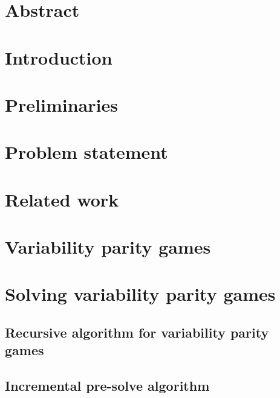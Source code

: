 \documentclass[a4paper,10pt]{report}
\author{Sjef van Loo}
\begin{document}
	
	
	
	\normalsize
	
	\chapter*{Abstract}\label{chapter:Abstract}
	\setcounter{page}{0}
	
	
	\tableofcontents
	
	\chapter{Introduction}\label{chapter:Introduction}
	\setcounter{page}{0}
	
	
	\chapter{Preliminaries}
	
	
	
	\chapter{Problem statement}
	
	
	
	\chapter{Related work}
	
	
	
	\chapter{Variability parity games}
	\label{part:verifying}
	
	
	
	\chapter{Solving variability parity games}
	
	
	\section{Recursive algorithm for variability parity games}
	
	
	\section{Incremental pre-solve algorithm}
	
	
\end{document}
